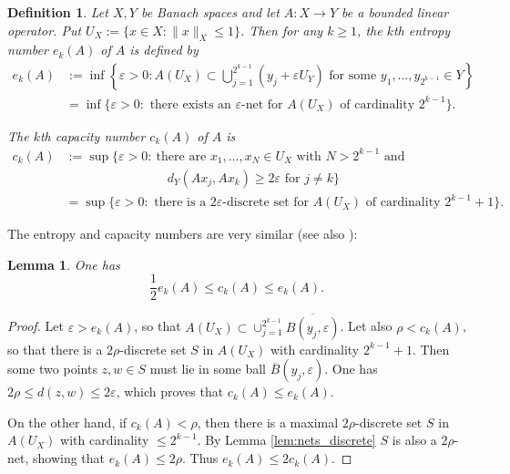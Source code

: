 \documentclass[12pt,twoside]{amsart}
\numberwithin{equation}{section}
\renewcommand{\leq}{\leqslant}
\renewcommand{\geq}{\geqslant}
\newtheorem{lemma}[theorem]{Lemma}
\newtheorem{definition}[theorem]{Definition}
\newcommand{\ol}[1]{\overline{#1}}
\newcommand{\eps}{\varepsilon}
\begin{document}
\begin{definition}
\label{defi:entropy_numb}
Let $X,Y$ be Banach spaces and let $A: X \to Y$ be a bounded linear operator. Put $U_X:=\{x\in X: \|x\|_X \leq 1 \}$. Then for any $k \geq 1$, the $k$th entropy number $e_k(A)$ of $A$ is defined by
\begin{align*}
  e_k(A)&:= \inf\left\{ \eps > 0: A(U_X) \subset \bigcup\limits_{j=1}^{2^{k-1}}(y_j + \eps U_Y) \mbox{ for some } y_1,\dots, y_{2^{k-1}} \in Y  \right\}\\
 &= \inf \{ \eps>0: \text{ there exists an $\varepsilon$-net for $A(U_X)$ of cardinality $2^{k-1}$}\} 
    . \end{align*}

The $k$th capacity number $c_k(A)$ of $A$ is 
\begin{align*}
c_k(A) &:= \sup \{ \eps > 0 : \ \text{there are $x_1, \ldots, x_N \in U_X$ with $N > 2^{k-1}$ and} \\
&  \qquad \qquad \qquad \qquad \text{$d_Y(Ax_j, Ax_k) \geq 2 \eps$ for $j \neq k$} \}
 \\ &  =   \sup \{ \eps>0:  \text{ there is a $2\eps$-discrete set for $A(U_X)$ of cardinality $2^{k-1}+1$}\} 
.
\end{align*}
\end{definition}




The entropy and capacity numbers are very similar (see also \cite[Section 1.1]{CS90}):

\begin{lemma}
One has 
\begin{equation} \label{entropy_capacity_relation}
\frac{1}{2} e_k(A) \leq c_k(A) \leq e_k(A).
\end{equation}
\end{lemma}
\begin{proof}
Let $\eps > e_k(A)$, so that $A(U_X) \subset \cup_{j=1}^{2^{k-1}} \ol{B(y_j, \eps)}$. Let also $\rho < c_k(A)$, so that there is a $2\rho$-discrete set $S$ in $A(U_X)$ with cardinality $2^{k-1}+1$. Then some two points $z, w \in S$ must lie in some ball $\ol{B}(y_j,\eps)$. One has $2\rho \leq d(z, w) \leq 2\eps$, which proves that $c_k(A) \leq e_k(A)$.

On the other hand, if $c_k(A) < \rho$, then there is a maximal $2\rho$-discrete set $S$ in $A(U_X)$ with cardinality $\leq 2^{k-1}$. By Lemma \ref{lem:nets_discrete} $S$ is also a $2\rho$-net, showing that $e_k(A) \leq 2\rho$. Thus $e_k(A) \leq 2 c_k(A)$.
\end{proof}
\end{document}
